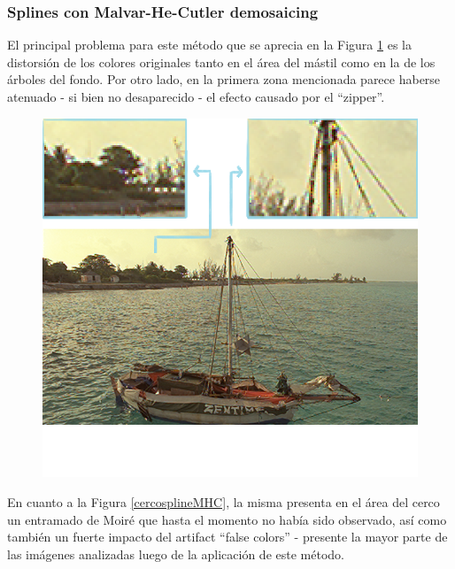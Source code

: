 \documentclass[a4paper]{article}
\begin{document}
\newpage

\subsubsection{Splines con Malvar-He-Cutler demosaicing}

El principal problema para este método que se aprecia en la Figura \ref{barcosplineMHC2} es la distorsión de los colores originales tanto en el área del mástil como en la de los árboles del fondo. Por otro lado, en la primera zona mencionada parece haberse atenuado - si bien no desaparecido - el efecto causado por el ``zipper''.



\begin{figure}[h!]
	\caption{}
	\begin{center}
	\includegraphics[scale=0.06]{imagenes/barcosplineMHC}
	\label{barcosplineMHC2}
  \end{center}
\end{figure}

\newpage

En cuanto a la Figura \ref{cercosplineMHC}, la misma presenta en el área del cerco un entramado de Moiré que hasta el momento no había sido observado, así como también un fuerte impacto del artifact ``false colors'' - presente la mayor parte de las imágenes analizadas luego de la aplicación de este método.
\end{document}
